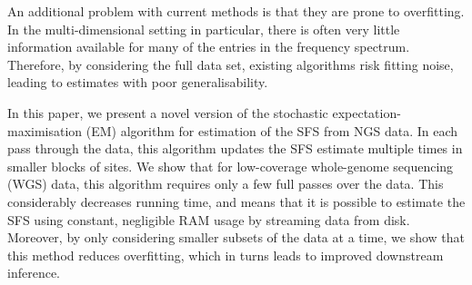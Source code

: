 An additional problem with current methods is that they are prone to overfitting.
In the multi-dimensional setting in particular, there is often very little information available for many of the entries in the frequency spectrum.
Therefore, by considering the full data set, existing algorithms risk fitting noise, leading to estimates with poor generalisability.

In this paper, we present a novel version of the stochastic expectation-maximisation (EM) algorithm for estimation of the SFS from NGS data.
In each pass through the data, this algorithm updates the SFS estimate multiple times in smaller blocks of sites.
We show that for low-coverage whole-genome sequencing (WGS) data, this algorithm requires only a few full passes over the data.
This considerably decreases running time, and means that it is possible to estimate the SFS using constant, negligible RAM usage by streaming data from disk.
Moreover, by only considering smaller subsets of the data at a time, we show that this method reduces overfitting, which in turns leads to improved downstream inference.
